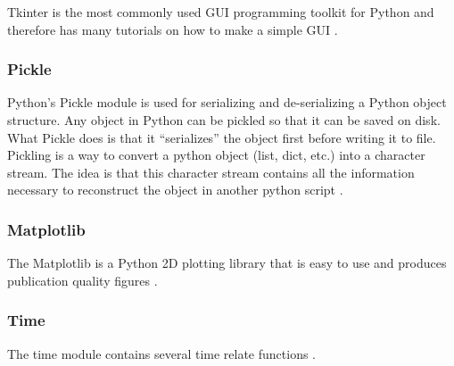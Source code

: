 Tkinter is the most commonly used GUI programming toolkit for Python and therefore has many tutorials on how to make a simple GUI \cite{Tkinter_module}. 

\subsubsection*{Pickle}

Python's Pickle module is used for serializing and de-serializing a Python object structure. Any object in Python can be pickled so that it can be saved on disk. What Pickle does is that it “serializes” the object first before writing it to file. Pickling is a way to convert a python object (list, dict, etc.) into a character stream. The idea is that this character stream contains all the information necessary to reconstruct the object in another python script \cite{Pickle_module}.

\subsubsection*{Matplotlib}

The Matplotlib is a Python 2D plotting library that is easy to use and produces publication quality figures \cite{matplotlib}.

\subsubsection*{Time}

The time module contains several time relate functions \cite{Time_module}.


